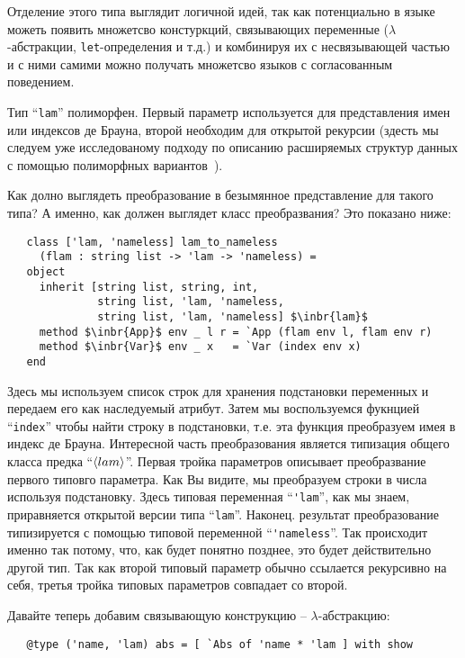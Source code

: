 Отделение этого типа выглядит логичной идей, так как потенциально в языке можеть появить множетсво констуркций, связывающих переменные 
($\lambda$-абстракции, \lstinline=let=-определения и т.д.) и комбинируя их с несвязывающей частью и с ними самими можно получать множетсво языков с согласованным поведением.

Тип ``\lstinline{lam}'' полиморфен. Первый параметр используется для представления имен или индексов де Брауна, второй необходим для открытой рекурсии (здесть мы следуем уже исследованому подходу по описанию расширяемых структур данных с помощью полиморфных 
вариантов~\cite{PolyVarReuse}).

Как долно выглядеть преобразование в безымянное представление для такого типа? А именно, как должен выглядет класс преобразвания? Это показано ниже:

\begin{lstlisting}
   class ['lam, 'nameless] lam_to_nameless
     (flam : string list -> 'lam -> 'nameless) =
   object
     inherit [string list, string, int,
              string list, 'lam, 'nameless,
              string list, 'lam, 'nameless] $\inbr{lam}$
     method $\inbr{App}$ env _ l r = `App (flam env l, flam env r)
     method $\inbr{Var}$ env _ x   = `Var (index env x)
   end
\end{lstlisting}

Здесь мы используем список строк для хранения подстановки переменных и  передаем его как наследуемый атрибут. Затем мы воспользуемся фукнцией 
``\lstinline{index}'' чтобы найти строку в подстановки, т.е.  эта функция преобразуем имея в индекс де Брауна. 
Интересной часть преобразования является типизация общего класса предка ``$\left<lam\right>$''. 
Первая тройка параметров описывает преобразвание первого типовго параметра. Как Вы видите, мы преобразуем строки в числа используя подстановку.
Здесь типовая переменная ``\lstinline{'lam}'', как мы знаем, приравняется открытой версии типа ``\lstinline{lam}''.
Наконец. результат преобразование типизируется с помощью типовой переменной ``\lstinline{'nameless}''. 
Так происходит именно так потому, что, как будет понятно позднее,  это будет действительно другой тип.
Так как второй типовый параметр обычно ссылается рекурсивно на себя, третья тройка типовых параметров совпадает со второй.

Давайте теперь добавим связывающую конструкцию -- $\lambda$-абстракцию:

\begin{lstlisting}
   @type ('name, 'lam) abs = [ `Abs of 'name * 'lam ] with show
\end{lstlisting}

